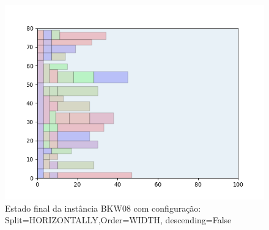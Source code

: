 \begin{figure}[H]
    \centering
    \caption[]{Estado final da instância BKW08 com configuração: Split=HORIZONTALLY,Order=WIDTH, descending=False}
    \label{fig:bkw08-horizontally-width-false}
    \includegraphics[scale=0.5]{output/figures/bkw/bkw08/horizontally/width/false/00}
\end{figure}